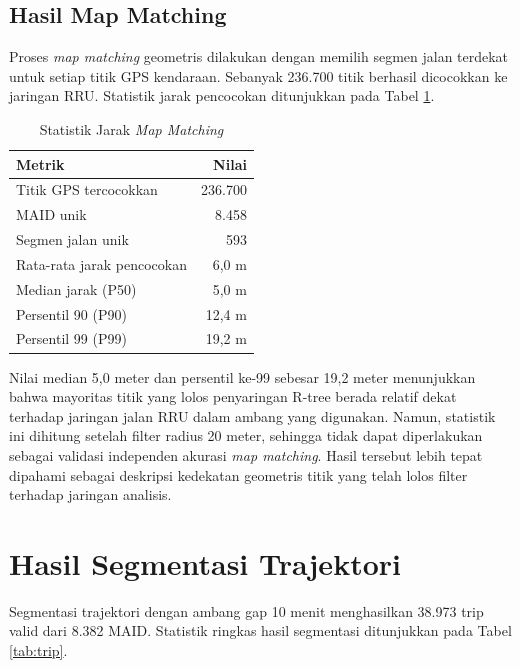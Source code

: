\subsection{Hasil Map Matching}

Proses \textit{map matching} geometris dilakukan dengan memilih segmen jalan terdekat untuk setiap titik GPS kendaraan. Sebanyak 236.700 titik berhasil dicocokkan ke jaringan RRU. Statistik jarak pencocokan ditunjukkan pada Tabel \ref{tab:mm}.

\begin{table}[htbp]
\centering
\caption{Statistik Jarak \textit{Map Matching}}
\label{tab:mm}
\begin{tabular}{lr}
\hline
Metrik & Nilai\\
\hline
Titik GPS tercocokkan & 236.700\\
MAID unik & 8.458\\
Segmen jalan unik & 593\\
Rata-rata jarak pencocokan & 6,0 m\\
Median jarak (P50) & 5,0 m\\
Persentil 90 (P90) & 12,4 m\\
Persentil 99 (P99) & 19,2 m\\
\hline
\end{tabular}
\end{table}

Nilai median 5,0 meter dan persentil ke-99 sebesar 19,2 meter menunjukkan bahwa mayoritas titik yang lolos penyaringan R-tree berada relatif dekat terhadap jaringan jalan RRU dalam ambang yang digunakan. Namun, statistik ini dihitung setelah filter radius 20 meter, sehingga tidak dapat diperlakukan sebagai validasi independen akurasi \textit{map matching}. Hasil tersebut lebih tepat dipahami sebagai deskripsi kedekatan geometris titik yang telah lolos filter terhadap jaringan analisis.

\section{Hasil Segmentasi Trajektori}

Segmentasi trajektori dengan ambang gap 10 menit menghasilkan 38.973 trip valid dari 8.382 MAID. Statistik ringkas hasil segmentasi ditunjukkan pada Tabel \ref{tab:trip}.

